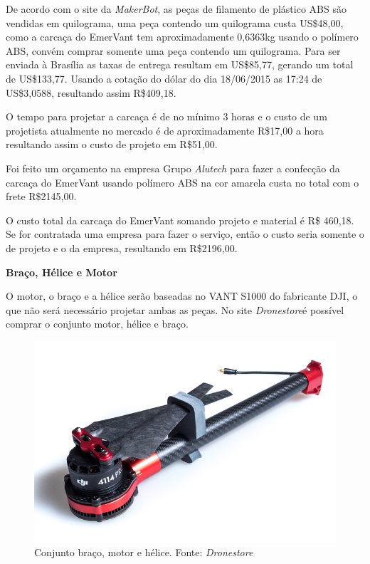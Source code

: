 De acordo com o site da \textit{MakerBot}\footnotemark, as peças de filamento de plástico ABS são vendidas em quilograma, uma peça contendo um quilograma custa US\$48,00, como a carcaça do EmerVant tem aproximadamente 0,6363kg usando o polímero ABS, convém comprar somente uma  peça contendo um quilograma. Para ser enviada à Brasília as taxas de entrega resultam em US\$85,77, gerando um total de US\$133,77. Usando a cotação do dólar do dia 18/06/2015 as 17:24 de US\$3,0588, resultando assim R\$409,18.

O tempo para projetar a carcaça é de no mínimo 3 horas e o custo de um projetista atualmente no mercado é de aproximadamente R\$17,00 a hora resultando assim o custo de projeto em R\$51,00.

Foi feito um orçamento na empresa Grupo \textit{Alutech} para fazer a confecção da carcaça do EmerVant usando polímero ABS na cor amarela custa no total com o frete R\$2145,00.

O custo total da carcaça do EmerVant somando projeto e material é R\$ 460,18. Se for contratada uma empresa para fazer o serviço, então o custo seria somente o de projeto e o da empresa, resultando em R\$2196,00.


\indent \textbf{Braço, Hélice e Motor}

O motor, o braço e a hélice serão baseadas no VANT S1000 do fabricante DJI, o que
não será necessário projetar ambas as peças. No site \textit{Dronestore}\footnotemark é possível comprar o
conjunto motor, hélice e braço.


\begin{figure}[H]
    \centering
      \includegraphics[keepaspectratio=true,scale=0.4]{figuras/braco_helice.jpg}
    \caption{Conjunto braço, motor e hélice. Fonte: \textit{Dronestore}}
    \label{fig:braco_helice}
\end{figure}

